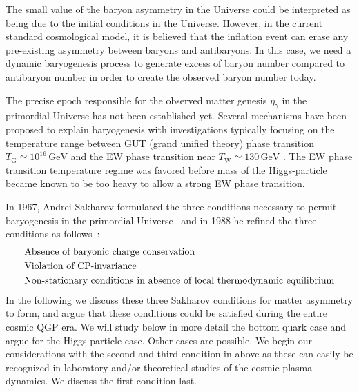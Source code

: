 The small value of the baryon asymmetry in the Universe could be interpreted as being due to the initial conditions in the Universe. However, in the current standard cosmological model, it is believed that the inflation event can erase any pre-existing asymmetry between baryons and antibaryons. In this case, we need a dynamic baryogenesis process to generate excess of baryon number compared to antibaryon number in order to create the observed baryon number today.

The precise epoch responsible for the observed matter genesis $\eta_\gamma$ in the primordial Universe has not been established yet. Several mechanisms have been proposed to explain baryogenesis with investigations typically focusing on the temperature range between GUT (grand unified theory) phase transition $T_\mathrm{G}\simeq10^{16}\,\mathrm{GeV}$ and the EW phase transition near $T_\mathrm{W}\simeq130\,\mathrm{GeV}$ \cite{Kuzmin:1985mm,Kuzmin:1987wn,Arnold:1987mh,Kolb:1996jt,Riotto:1999yt,Nielsen:2001fy,Giudice:2003jh,Davidson:2008bu,Morrissey:2012db,Canetti:2012zc}. {\color{black}The EW phase transition temperature regime was favored before mass of the Higgs-particle became known to be too heavy to allow a strong EW phase transition.}

In 1967, Andrei Sakharov formulated the three conditions necessary to permit baryogenesis in the primordial Universe~\cite{Sakharov:1967dj} and in 1988 he refined the three conditions as follows~\cite{Sakharov:1988vdp}:
\begin{subequations}\label{Sakharov}
\begin{align}
 &\text{Absence of baryonic charge conservation}\\
 &\text{Violation of CP-invariance}\index{CP
 violation}\\
&\text{Non-stationary conditions in absence of local thermodynamic equilibrium}
\end{align}
\end{subequations}
{\color{black} In the following we discuss these three Sakharov conditions for matter asymmetry to form, and argue that these conditions  could be satisfied during the entire cosmic QGP era. We will study below in more detail the bottom quark case and argue for the Higgs-particle case. Other cases are possible. We begin our considerations with the second and third condition in  above as these can easily be recognized in laboratory and/or theoretical studies of the cosmic plasma dynamics. We discuss the first condition last.}

